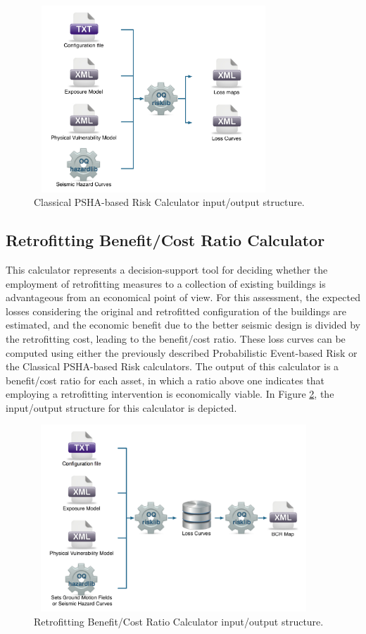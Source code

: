 \begin{figure}[ht]
\centering
\includegraphics[width=9cm,height=7cm]{./figures/risk/ClassicalPSHA.pdf}
\caption{Classical PSHA-based Risk Calculator input/output structure.}
\label{fig:ClassicalPSHA}
\end{figure}

\subsection{Retrofitting Benefit/Cost Ratio Calculator}
This calculator represents a decision-support tool for deciding whether the employment of retrofitting measures to a collection of existing buildings is advantageous from an economical point of view. For this assessment, the expected losses considering the original and retrofitted configuration of the buildings are estimated, and the economic benefit due to the better seismic design is divided by the retrofitting cost, leading to the benefit/cost ratio. These loss curves can be computed using either the previously described Probabilistic Event-based Risk or the Classical PSHA-based Risk calculators. The output of this calculator is a benefit/cost ratio for each asset, in which a ratio above one indicates that employing  a retrofitting intervention is economically viable. In Figure \ref{fig:BCR}, the input/output structure for this calculator is depicted.

\begin{figure}[ht]
\centering
\includegraphics[width=10.5cm,height=7cm]{./figures/risk/BCR.pdf}
\caption{Retrofitting Benefit/Cost Ratio Calculator input/output structure.}
\label{fig:BCR}
\end{figure}